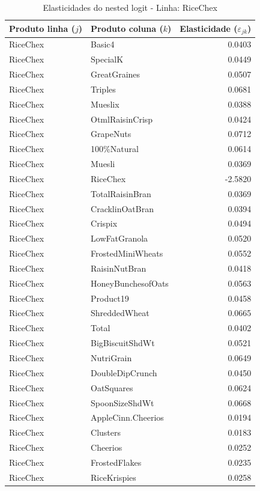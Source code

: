 \begingroup
\begin{table}[H]
\centering
\caption{Elasticidades do nested logit - Linha: RiceChex}
\label{tab:elas-nested-ricechex}
\small
\begin{tabular}{llr}
\toprule
Produto linha ($j$) & Produto coluna ($k$) & Elasticidade ($\varepsilon_{jk}$) \\
\midrule
RiceChex & Basic4 & 0.0403 \\
RiceChex & SpecialK & 0.0449 \\
RiceChex & GreatGraines & 0.0507 \\
RiceChex & Triples & 0.0681 \\
RiceChex & Mueslix & 0.0388 \\
RiceChex & OtmlRaisinCrisp & 0.0424 \\
RiceChex & GrapeNuts & 0.0712 \\
RiceChex & 100\%Natural & 0.0614 \\
RiceChex & Muesli & 0.0369 \\
RiceChex & RiceChex & -2.5820 \\
RiceChex & TotalRaisinBran & 0.0369 \\
RiceChex & CracklinOatBran & 0.0394 \\
RiceChex & Crispix & 0.0494 \\
RiceChex & LowFatGranola & 0.0520 \\
RiceChex & FrostedMiniWheats & 0.0552 \\
RiceChex & RaisinNutBran & 0.0418 \\
RiceChex & HoneyBunchesofOats & 0.0563 \\
RiceChex & Product19 & 0.0458 \\
RiceChex & ShreddedWheat & 0.0665 \\
RiceChex & Total & 0.0402 \\
RiceChex & BigBiscuitShdWt & 0.0521 \\
RiceChex & NutriGrain & 0.0649 \\
RiceChex & DoubleDipCrunch & 0.0450 \\
RiceChex & OatSquares & 0.0624 \\
RiceChex & SpoonSizeShdWt & 0.0668 \\
RiceChex & AppleCinn.Cheerios & 0.0194 \\
RiceChex & Clusters & 0.0183 \\
RiceChex & Cheerios & 0.0252 \\
RiceChex & FrostedFlakes & 0.0235 \\
RiceChex & RiceKrispies & 0.0258 \\

\end{tabular}
\end{table}
